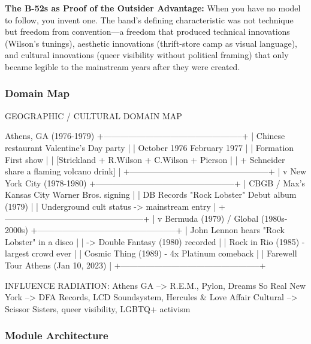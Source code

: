 \documentclass[11pt,letterpaper]{article}
\begin{document}
\textbf{The B-52s as Proof of the Outsider Advantage:} When you have no model to follow, you invent one. The band's defining characteristic was not technique but freedom from convention---a freedom that produced technical innovations (Wilson's tunings), aesthetic innovations (thrift-store camp as visual language), and cultural innovations (queer visibility without political framing) that only became legible to the mainstream years after they were created.

\subsubsection{Domain Map}

\begin{asciibox}
GEOGRAPHIC / CULTURAL DOMAIN MAP

Athens, GA (1976-1979)
+--------------------------------------------------+
|  Chinese restaurant    Valentine's Day party     |
|  October 1976          February 1977             |
|  Formation             First show                |
|  [Strickland + R.Wilson + C.Wilson + Pierson     |
|   + Schneider share a flaming volcano drink]     |
+--------------------------------------------------+
         |
         v
New York City (1978-1980)
+--------------------------------------------------+
|  CBGB / Max's Kansas City  Warner Bros. signing  |
|  DB Records "Rock Lobster"  Debut album (1979)   |
|  Underground cult status -> mainstream entry     |
+--------------------------------------------------+
         |
         v
Bermuda (1979) / Global (1980s-2000s)
+--------------------------------------------------+
|  John Lennon hears "Rock Lobster" in a disco     |
|  -> Double Fantasy (1980) recorded               |
|  Rock in Rio (1985) - largest crowd ever         |
|  Cosmic Thing (1989) - 4x Platinum comeback      |
|  Farewell Tour Athens (Jan 10, 2023)             |
+--------------------------------------------------+

INFLUENCE RADIATION:
Athens GA --> R.E.M., Pylon, Dreams So Real
New York  --> DFA Records, LCD Soundsystem, Hercules & Love Affair
Cultural  --> Scissor Sisters, queer visibility, LGBTQ+ activism
\end{asciibox}

\subsubsection{Module Architecture}
\end{document}
